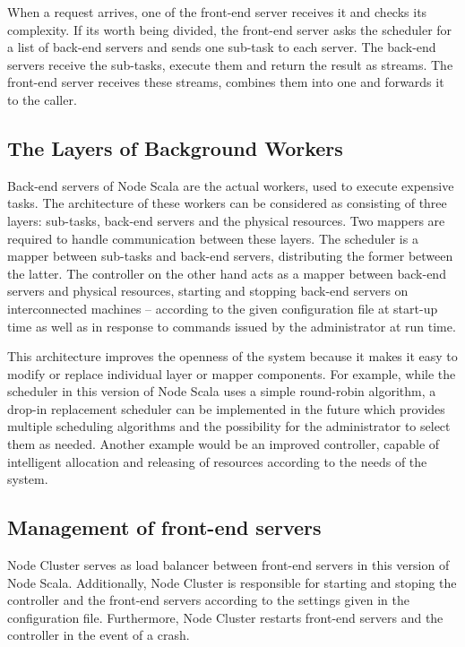 \documentclass[10pt,conference,letterpaper]{IEEEtran}
\begin{document}
When a request arrives, one of the front-end server receives it and
checks its complexity. If its worth being divided, the front-end
server asks the scheduler for a list of back-end servers and sends one
sub-task to each server. The back-end servers receive the sub-tasks,
execute them and return the result as streams. The front-end server
receives these streams, combines them into one and forwards it to the
caller.

\subsection{The Layers of Background Workers}

Back-end servers of Node Scala are the actual workers, used to execute
expensive tasks. The architecture of these workers can be considered
as consisting of three layers: sub-tasks, back-end servers and the
physical resources. Two mappers are required to handle communication
between these layers. The scheduler is a mapper between sub-tasks and
back-end servers, distributing the former between the latter. The
controller on the other hand acts as a mapper between back-end servers
and physical resources, starting and stopping back-end servers on
interconnected machines -- according to the given configuration file
at start-up time as well as in response to commands issued by the
administrator at run time.

This architecture improves the openness of the system because it makes
it easy to modify or replace individual layer or mapper components.
For example, while the scheduler in this version of Node Scala uses a
simple round-robin algorithm, a drop-in replacement scheduler can be
implemented in the future which provides multiple scheduling
algorithms and the possibility for the administrator to select them as
needed. Another example would be an improved controller, capable of
intelligent allocation and releasing of resources according to the
needs of the system.

\subsection{Management of front-end servers}
Node Cluster serves as load balancer between front-end servers in this version of Node Scala. Additionally, Node Cluster is responsible for starting and stoping the controller and the front-end servers according to the settings 
given in the configuration file. Furthermore, Node Cluster restarts 
front-end servers and the controller in the event of a crash.
\end{document}
